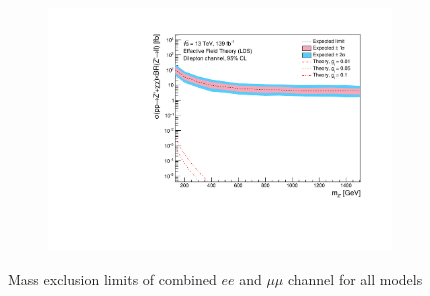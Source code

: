 \documentclass[12pt, a4paper]{book}
\begin{document}
\begin{figure}[!ht]
\begin{subfigure}[b]{0.49\textwidth}
   \end{subfigure}
   \hfill
   \begin{subfigure}[b]{0.49\textwidth}
      \centering
      \includegraphics[width=1\textwidth]{Limits/EFT_LDS/mass_exclusion_comb.pdf}
   \end{subfigure}
   \caption[Mass exclusion limits of combined $ee$ and $\mu\mu$ channel for all models]{Mass exclusion limits of combined $ee$ and $\mu\mu$ channel for all models}\label{fig:model_dep_exclusions}
\end{figure}
\clearpage
\end{document}
